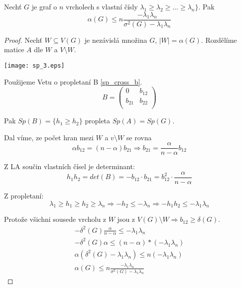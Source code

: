 \begin{theorem}
	Nechť $G$ je graf o $n$ vrcholech s vlastní čísly $\lambda_1 \geq \lambda_2 \geq ... \geq \lambda_n \}$. Pak
	\[ \alpha(G) \leq n \frac{-\lambda_1\lambda_n}{\sigma^2(G) - \lambda_1\lambda_n} \]
\end{theorem}
\begin{proof}
	Nechť $W \subseteq V(G)$ je nezávislá množina $G$, $|W| = \alpha(G)$. Rozdělíme matice $A$ dle $W$ a $V\setminus W$.

	\texttt{[image: sp\_3.eps]}

	Použijeme Vetu o propletaní B \cref{sp_cross_b}.
	\[ B =
	\begin{pmatrix}
		0 & b_{12}\\
		b_{21} & b_{22}\\
	\end{pmatrix}
	\]

	Pak $Sp(B) = \{ h_1 \geq h_2 \}$ propleta $Sp(A) = Sp(G)$.

	Dal víme, ze počet hran mezi $W$ a $v\setminus W$ se rovna
	\[ \alpha b_{12} = (n - \alpha) b_{21} \Rightarrow b_{21} = \frac{\alpha}{n - \alpha} b_{12}\]

	Z LA součin vlastních čísel je determinant:
	\[ h_1h_2 = det(B) = -b_{12} \cdot b_{21} = b_{12}^2 \cdot \frac{\alpha}{n - \alpha}\]

	Z propletaní:
	\[ \lambda_1 \geq h_1 \geq h_2 \geq \lambda_n \Rightarrow -h_2 \leq -\lambda_n \Rightarrow -h_1h_2 \leq -\lambda_1 \lambda_n \]

	Protože všichni sousede vrcholu z $W$ jsou z $V(G) \setminus W \Rightarrow b_{12} \geq \delta(G)$.
	\begin{gather*}
	-\delta^2(G) \frac{\alpha}{n - \alpha} \leq -\lambda_1 \lambda_n\\
	-\delta^2(G) \alpha \leq (n - \alpha) * (-\lambda_1 \lambda_n)\\
	\alpha(\delta^2(G) - \lambda_1 \lambda_n) \leq n(-\lambda_1 \lambda_n)\\
	\alpha(G) \leq n \frac{-\lambda_1\lambda_n}{\sigma^2(G) - \lambda_1\lambda_n}
	\end{gather*}
\end{proof}

